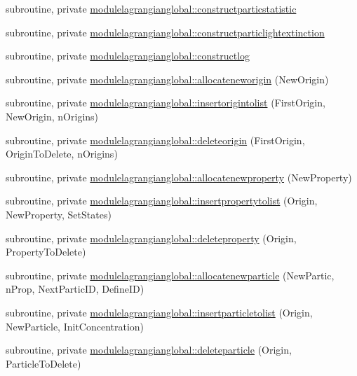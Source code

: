 \begin{DoxyCompactItemize}
\item 
subroutine, private \mbox{\hyperlink{namespacemodulelagrangianglobal_a13c381524822a2310bb011dc1680ed61}{modulelagrangianglobal\+::constructparticstatistic}}
\item 
subroutine, private \mbox{\hyperlink{namespacemodulelagrangianglobal_a4ba42e3d7ac7a48f0a6a551322aaf754}{modulelagrangianglobal\+::constructparticlightextinction}}
\item 
subroutine, private \mbox{\hyperlink{namespacemodulelagrangianglobal_aa700601bd9f8ad04a50534e66725efc4}{modulelagrangianglobal\+::constructlog}}
\item 
subroutine, private \mbox{\hyperlink{namespacemodulelagrangianglobal_a537c7269309c583343ae41dfe244a2b0}{modulelagrangianglobal\+::allocateneworigin}} (New\+Origin)
\item 
subroutine, private \mbox{\hyperlink{namespacemodulelagrangianglobal_ab902fc69902a11b86ed8b0b64ece38d9}{modulelagrangianglobal\+::insertorigintolist}} (First\+Origin, New\+Origin, n\+Origins)
\item 
subroutine, private \mbox{\hyperlink{namespacemodulelagrangianglobal_a47b61d17a8d0a48abe9ccb2937d67a93}{modulelagrangianglobal\+::deleteorigin}} (First\+Origin, Origin\+To\+Delete, n\+Origins)
\item 
subroutine, private \mbox{\hyperlink{namespacemodulelagrangianglobal_aa537bff97afb419645e62f2b096b2e56}{modulelagrangianglobal\+::allocatenewproperty}} (New\+Property)
\item 
subroutine, private \mbox{\hyperlink{namespacemodulelagrangianglobal_ad71ed77715b3249cc24c592dfcca2fc8}{modulelagrangianglobal\+::insertpropertytolist}} (Origin, New\+Property, Set\+States)
\item 
subroutine, private \mbox{\hyperlink{namespacemodulelagrangianglobal_af269f1bc18ee6db0ac6b2b6d27bc7499}{modulelagrangianglobal\+::deleteproperty}} (Origin, Property\+To\+Delete)
\item 
subroutine, private \mbox{\hyperlink{namespacemodulelagrangianglobal_adf7a8f7c3f2d3dd4f0472f6d4d1ec56e}{modulelagrangianglobal\+::allocatenewparticle}} (New\+Partic, n\+Prop, Next\+Partic\+ID, Define\+ID)
\item 
subroutine, private \mbox{\hyperlink{namespacemodulelagrangianglobal_a2d4644f4134b54b72e810da551bd14a9}{modulelagrangianglobal\+::insertparticletolist}} (Origin, New\+Particle, Init\+Concentration)
\item 
subroutine, private \mbox{\hyperlink{namespacemodulelagrangianglobal_aef9b588fe6eb57b2059f4fd96df7bd7d}{modulelagrangianglobal\+::deleteparticle}} (Origin, Particle\+To\+Delete)

\end{DoxyCompactItemize}
